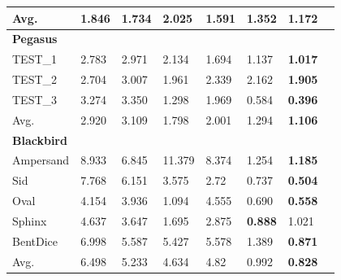 \begin{table}[H]
{\begin{tabular}{C{1.8cm}|C{1.25cm}C{1.25cm}C{1.25cm}C{1.25cm}C{1.25cm}C{1.25cm}C{1.25cm}}
         Avg. & 1.846 &  1.734 &  2.025 &  1.591 &  1.352 &  \textbf{1.172} \\

\midrule
\midrule
        \raggedright \textbf{Pegasus}  &  &  &  &  &   \\     
        TEST\_1&  2.783 &  2.971 &  2.134 &  1.694 &  1.137 &  \textbf{1.017} \\
        TEST\_2 &  2.704 &  3.007 &  1.961 &  2.339 &  2.162 &  \textbf{1.905} \\
        TEST\_3 &  3.274 &  3.350 &  1.298 &  1.969 &  0.584 &  \textbf{0.396} \\
        Avg. &  2.920 &  3.109 &  1.798 &  2.001 &  1.294 &  \textbf{1.106} \\
        
\midrule
\midrule
        \raggedright \textbf{Blackbird}  &  &  &  &  &   \\ 
          Ampersand & 8.933 &  6.845 &  11.379 &  8.374 &  1.254 &  \textbf{1.185} \\
        Sid & 7.768 &  6.151 &  3.575 &  2.72 &  0.737 &  \textbf{0.504} \\
        Oval& 4.154 &  3.936 &  1.094 &  4.555 &  0.690 &  \textbf{0.558} \\
        Sphinx& 4.637 &  3.647 &  1.695 &  2.875 &  \textbf{0.888} &  1.021 \\
        BentDice& 6.998 &  5.587 &  5.427 &  5.578 &  1.389 &  \textbf{0.871} \\
        Avg.&  6.498 &  5.233 &  4.634 &  4.82 &  0.992 &  \textbf{0.828} \\
        \bottomrule
        \bottomrule
    \end{tabular} 
    }
\end{table}